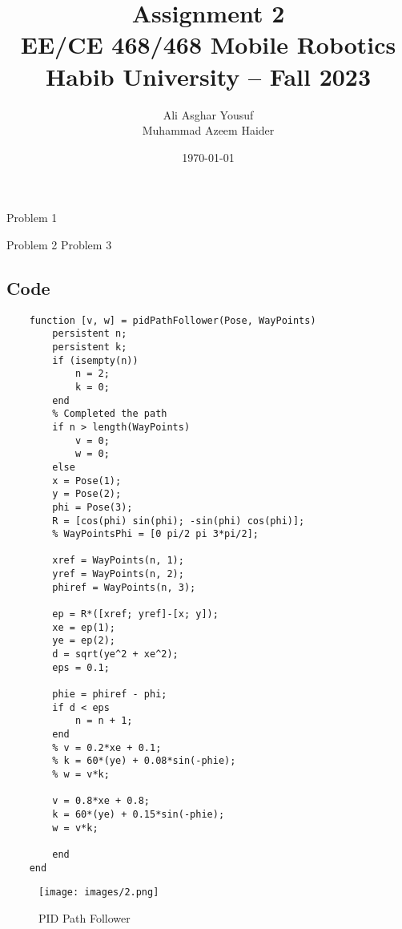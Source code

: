 \documentclass[answers]{exam}
\title{Assignment 2\\ EE/CE 468/468 Mobile Robotics\\ Habib University -- Fall 2023}
\author{Ali Asghar Yousuf \\ Muhammad Azeem Haider }  %
\date{\today}
\begin{document}
\maketitle

\begin{questions}
    \question Problem 1

    \question Problem 2
    \question Problem 3
    \subsection*{Code}

    \begin{lstlisting}
    function [v, w] = pidPathFollower(Pose, WayPoints)
        persistent n;
        persistent k;
        if (isempty(n))
            n = 2;
            k = 0;
        end
        % Completed the path
        if n > length(WayPoints)
            v = 0;
            w = 0;
        else
        x = Pose(1);
        y = Pose(2);
        phi = Pose(3);
        R = [cos(phi) sin(phi); -sin(phi) cos(phi)];
        % WayPointsPhi = [0 pi/2 pi 3*pi/2];

        xref = WayPoints(n, 1);
        yref = WayPoints(n, 2);
        phiref = WayPoints(n, 3);

        ep = R*([xref; yref]-[x; y]);
        xe = ep(1);
        ye = ep(2);
        d = sqrt(ye^2 + xe^2);
        eps = 0.1;

        phie = phiref - phi;
        if d < eps
            n = n + 1;
        end
        % v = 0.2*xe + 0.1;
        % k = 60*(ye) + 0.08*sin(-phie);  
        % w = v*k;

        v = 0.8*xe + 0.8;
        k = 60*(ye) + 0.15*sin(-phie);
        w = v*k;

        end
    end
    \end{lstlisting}

    \begin{figure}[H]
        \centering
        \texttt{[image: images/2.png]}
        \caption{PID Path Follower}
        \label{fig:my_label}
    \end{figure}


\end{questions}
\end{document}
